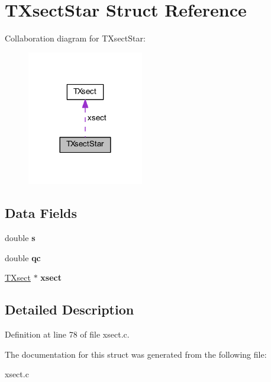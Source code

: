 \hypertarget{struct_t_xsect_star}{}\section{T\+Xsect\+Star Struct Reference}
\label{struct_t_xsect_star}


Collaboration diagram for T\+Xsect\+Star\+:
\nopagebreak
\begin{figure}[H]
\begin{center}
\leavevmode
\includegraphics[width=144pt]{d3/d60/struct_t_xsect_star__coll__graph}
\end{center}
\end{figure}
\subsection*{Data Fields}
\begin{DoxyCompactItemize}
\item 
\mbox{\label{struct_t_xsect_star_ad62e712560f6344b96d4c080a2ba9c92}} 
double {\bfseries s}
\item 
\mbox{\label{struct_t_xsect_star_ab50d58782a52516a2af7ff772dde89ae}} 
double {\bfseries qc}
\item 
\mbox{\label{struct_t_xsect_star_a5a90779608e555fc22b50c1d04e132be}} 
\hyperlink{struct_t_xsect}{T\+Xsect} $\ast$ {\bfseries xsect}
\end{DoxyCompactItemize}


\subsection{Detailed Description}


Definition at line 78 of file xsect.\+c.



The documentation for this struct was generated from the following file\+:\begin{DoxyCompactItemize}
\item 
xsect.\+c\end{DoxyCompactItemize}
